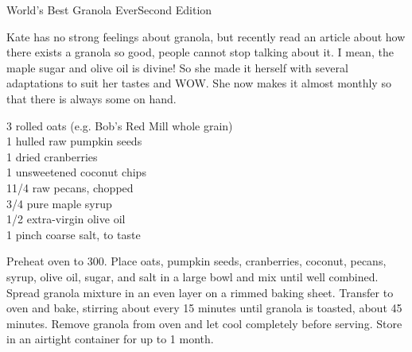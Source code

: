 \begin{entry}{World's Best Granola Ever}{Second Edition}

\begin{open}
 Kate has no strong feelings about granola, but recently read an article
  about how there exists a granola so good, people cannot stop talking about
  it. I mean, the maple sugar and olive oil is divine! So she made it herself
  with several adaptations to suit her tastes and WOW. She now makes it
  almost monthly so that there is always some on hand.
\end{open}

\begin{ingredients}
    \SI{3}{\cup} rolled oats (e.g. Bob's Red Mill whole grain)\\
    \SI{1}{\cup} hulled raw pumpkin seeds\\
    \SI{1}{\cup} dried cranberries\\
    \SI{1}{\cup} unsweetened coconut chips\\
    1\SI{1/4}{\cup} raw pecans, chopped\\
    \SI{3/4}{\cup} pure maple syrup\\
    \SI{1/2}{\cup} extra-virgin olive oil\\
    1 pinch coarse salt, to taste
\end{ingredients}
Preheat oven to \SI{300}{\degreeF}. Place oats, pumpkin seeds, cranberries,
coconut, pecans, syrup, olive oil, sugar, and salt in a large bowl and mix
until well combined. Spread granola mixture in an even layer on a rimmed
baking sheet. Transfer to oven and bake, stirring about every 15 minutes until
granola is toasted, about 45 minutes. Remove granola from oven and let cool
completely before serving. Store in an airtight container for up to 1 month.
\end{entry}



